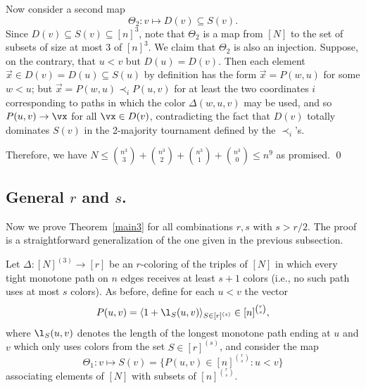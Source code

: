     Now consider a second map
    \begin{equation*}
        \Theta_2: v \longmapsto D(v) \subseteq S(v).
    \end{equation*}
    Since $D(v) \subseteq S(v) \subseteq [n]^3$, note that $\Theta_{2}$ is a map from $[N]$ to the set of subsets of size at most $3$ of $[n]^3$. We claim that $\Theta_2$ is also an injection.
    Suppose, on the contrary, that $u < v$ but $D(u) = D(v)$.
    Then each element $\Vec{x} \in D(v) = D(u) \subseteq S(u)$ by definition has the form $\Vec{x} = P(w,u)$ for some $w < u$;
    but $\Vec{x} = P(w,u) \prec_i P(u,v)$ for at least the two coordinates $i$ corresponding to paths in which the color $\Delta(w,u,v)$ may be used, and so $P(u,v) \to \vx$ for all $\vx \in D(v)$, contradicting the fact that $D(v)$ totally dominates $S(v)$ in the 2-majority tournament defined by the $\prec_i$'s.

    Therefore, 
    we have $N \leq \binom{n^3}{3}+\binom{n^3}{2} +\binom{n^3}{1}+\binom{n^3}{0} \le n^9$ as promised. \qed


\subsection{General $r$ and $s$.}

Now we prove Theorem~\ref{main3} for all combinations $r, s$ with $s > r/2$.
The proof is a straightforward generalization of the one given in the previous subsection.

    Let $\Delta: [N]^{(3)} \to [r]$ be an $r$-coloring of the triples of $[N]$ in which every tight monotone path on $n$ edges receives at least $s+1$ colors (i.e., no such path uses at most $s$ colors).
    As before, define for each $u < v$ the vector
    \begin{equation*}
        P(u,v) = \langle 1 + \l_S(u,v)\rangle_{S \in [r]^{(s)}} \in [n]^{\binom{r}{s}},
    \end{equation*}
    where $\l_S(u,v)$ denotes the length of the longest monotone path ending at $u$ and $v$ which only uses colors from the set $S \in [r]^{(s)}$,
    and consider the map
    \begin{equation*}
        \Theta_1: v \longmapsto S(v) = \{P(u,v) \in [n]^{\binom{r}{s}}: u < v\}
    \end{equation*}
    associating elements of $[N]$ with subsets of $[n]^{\binom{r}{s}}$.

